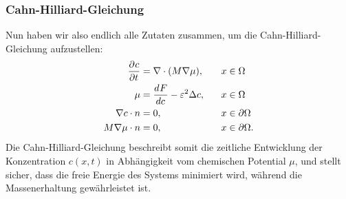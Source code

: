 \subsubsection{Cahn-Hilliard-Gleichung}
Nun haben wir also endlich alle Zutaten zusammen,
um die Cahn-Hilliard-Gleichung aufzustellen:
\begin{align}
\begin{aligned}
\frac{\partial^{} c}{\partial t^{}}
&=
\nabla \cdot (M \nabla \mu)
,\quad&
x &\in \Omega
\\
\mu
&=
\frac{d^{}{F}}{d{c^{}}} -  \varepsilon^2 \Delta c
,&
x &\in \Omega
\\
\nabla c \cdot n
&=
0
,&
x &\in \partial\Omega
\\
M \nabla \mu \cdot n
&=
0
,&
x &\in \partial\Omega
.
\end{aligned}
\label{cahnhilliard:cheq}
\end{align}
Die Cahn-Hilliard-Gleichung beschreibt somit
die zeitliche Entwicklung der Konzentration $c(x,t)$
in Abhängigkeit vom chemischen Potential $\mu$,
und stellt sicher,
dass die freie Energie des Systems minimiert wird,
während die Massenerhaltung gewährleistet ist.
